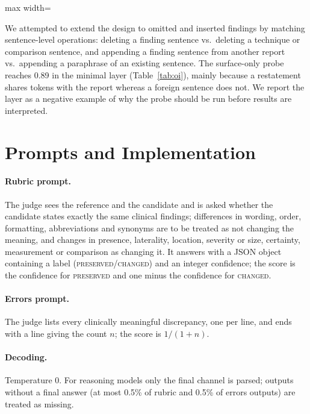 \documentclass[11pt]{article}
\begin{document}
\begin{table}[t]
\centering
\small
\begin{adjustbox}{max width=\columnwidth}

\end{adjustbox}
\caption{Omission/insertion layer (MIMIC-CXR, 150 targets each). The surface-only probe separates the classes, so paired accuracies are not controlled measurements.}
\label{tab:oi}
\end{table}

We attempted to extend the design to omitted and inserted findings by matching sentence-level operations: deleting a finding sentence vs.\ deleting a technique or comparison sentence, and appending a finding sentence from another report vs.\ appending a paraphrase of an existing sentence. The surface-only probe reaches 0.89 in the minimal layer (Table~\ref{tab:oi}), mainly because a restatement shares tokens with the report whereas a foreign sentence does not. We report the layer as a negative example of why the probe should be run before results are interpreted.

\section{Prompts and Implementation}
\label{app:prompts}

\paragraph{Rubric prompt.} The judge sees the reference and the candidate and is asked whether the candidate states exactly the same clinical findings; differences in wording, order, formatting, abbreviations and synonyms are to be treated as not changing the meaning, and changes in presence, laterality, location, severity or size, certainty, measurement or comparison as changing it. It answers with a JSON object containing a label (\textsc{preserved}/\textsc{changed}) and an integer confidence; the score is the confidence for \textsc{preserved} and one minus the confidence for \textsc{changed}.

\paragraph{Errors prompt.} The judge lists every clinically meaningful discrepancy, one per line, and ends with a line giving the count $n$; the score is $1/(1+n)$.

\paragraph{Decoding.} Temperature 0. For reasoning models only the final channel is parsed; outputs without a final answer (at most 0.5\% of rubric and 0.5\% of errors outputs) are treated as missing.
\end{document}
